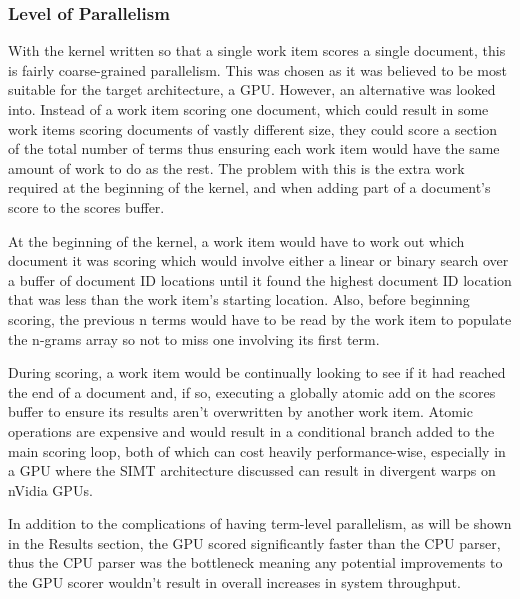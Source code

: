 \subsubsection{Level of Parallelism}

With the kernel written so that a single work item scores a single document,
this is fairly coarse-grained parallelism. This was chosen as it was believed to
be most suitable for the target architecture, a GPU. However, an alternative was
looked into. Instead of a work item scoring one document, which could result in
some work items scoring documents of vastly different size, they could score a
section of the total number of terms thus ensuring each work item would have the
same amount of work to do as the rest. The problem with this is the extra work
required at the beginning of the kernel, and when adding part of a document's
score to the scores buffer.

At the beginning of the kernel, a work item would have to work out which
document it was scoring which would involve either a linear or binary search
over a buffer of document ID locations until it found the highest document
ID location that was less than the work item's starting location. Also, before
beginning scoring, the previous n terms would have to be read by the work item
to populate the n-grams array so not to miss one involving its first term.

During scoring, a work item would be continually looking to see if it had
reached the end of a document and, if so, executing a globally atomic add on the
scores buffer to ensure its results aren't overwritten by another work item.
Atomic operations are expensive and would result in a conditional branch added
to the main scoring loop, both of which can cost heavily performance-wise,
especially in a GPU where the SIMT architecture discussed can result in
divergent warps on nVidia GPUs.

In addition to the complications of having term-level parallelism, as will be
shown in the Results section, the GPU scored significantly faster than the CPU
parser, thus the CPU parser was the bottleneck meaning any potential
improvements to the GPU scorer wouldn't result in overall increases in system
throughput.

